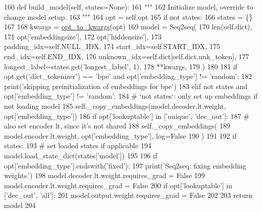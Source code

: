 \begin{DoxyCode}
160     \textcolor{keyword}{def }build\_model(self, states=None):
161         \textcolor{stringliteral}{"""}
162 \textcolor{stringliteral}{        Initialize model, override to change model setup.}
163 \textcolor{stringliteral}{        """}
164         opt = self.opt
165         \textcolor{keywordflow}{if} \textcolor{keywordflow}{not} states:
166             states = \{\}
167 
168         kwargs = \hyperlink{namespaceparlai_1_1agents_1_1legacy__agents_1_1seq2seq_1_1modules__v1_af13e3733abb5828b0c0a75d95833441c}{opt\_to\_kwargs}(opt)
169         model = Seq2seq(
170             len(self.dict),
171             opt[\textcolor{stringliteral}{'embeddingsize'}],
172             opt[\textcolor{stringliteral}{'hiddensize'}],
173             padding\_idx=self.NULL\_IDX,
174             start\_idx=self.START\_IDX,
175             end\_idx=self.END\_IDX,
176             unknown\_idx=self.dict[self.dict.unk\_token],
177             longest\_label=states.get(\textcolor{stringliteral}{'longest\_label'}, 1),
178             **kwargs,
179         )
180 
181         \textcolor{keywordflow}{if} opt.get(\textcolor{stringliteral}{'dict\_tokenizer'}) == \textcolor{stringliteral}{'bpe'} \textcolor{keywordflow}{and} opt[\textcolor{stringliteral}{'embedding\_type'}] != \textcolor{stringliteral}{'random'}:
182             print(\textcolor{stringliteral}{'skipping preinitialization of embeddings for bpe'})
183         \textcolor{keywordflow}{elif} \textcolor{keywordflow}{not} states \textcolor{keywordflow}{and} opt[\textcolor{stringliteral}{'embedding\_type'}] != \textcolor{stringliteral}{'random'}:
184             \textcolor{comment}{# `not states`: only set up embeddings if not loading model}
185             self.\_copy\_embeddings(model.decoder.lt.weight, opt[\textcolor{stringliteral}{'embedding\_type'}])
186             \textcolor{keywordflow}{if} opt[\textcolor{stringliteral}{'lookuptable'}] \textcolor{keywordflow}{in} [\textcolor{stringliteral}{'unique'}, \textcolor{stringliteral}{'dec\_out'}]:
187                 \textcolor{comment}{# also set encoder lt, since it's not shared}
188                 self.\_copy\_embeddings(
189                     model.encoder.lt.weight, opt[\textcolor{stringliteral}{'embedding\_type'}], log=\textcolor{keyword}{False}
190                 )
191 
192         \textcolor{keywordflow}{if} states:
193             \textcolor{comment}{# set loaded states if applicable}
194             model.load\_state\_dict(states[\textcolor{stringliteral}{'model'}])
195 
196         \textcolor{keywordflow}{if} opt[\textcolor{stringliteral}{'embedding\_type'}].endswith(\textcolor{stringliteral}{'fixed'}):
197             print(\textcolor{stringliteral}{'Seq2seq: fixing embedding weights.'})
198             model.decoder.lt.weight.requires\_grad = \textcolor{keyword}{False}
199             model.encoder.lt.weight.requires\_grad = \textcolor{keyword}{False}
200             \textcolor{keywordflow}{if} opt[\textcolor{stringliteral}{'lookuptable'}] \textcolor{keywordflow}{in} [\textcolor{stringliteral}{'dec\_out'}, \textcolor{stringliteral}{'all'}]:
201                 model.output.weight.requires\_grad = \textcolor{keyword}{False}
202 
203         \textcolor{keywordflow}{return} model
204 
\end{DoxyCode}
